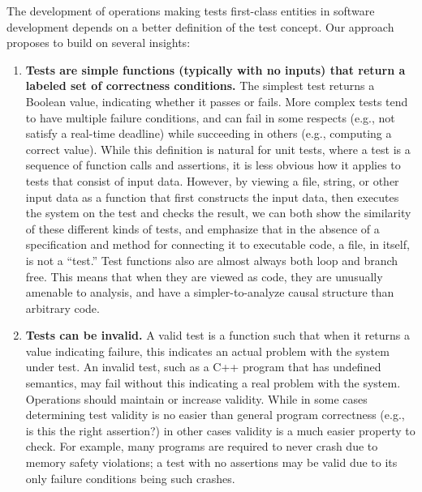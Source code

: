 The development of operations making tests first-class entities in
software development depends on a better definition of the test
concept.  Our approach proposes to build on several insights:

\begin{enumerate}
\item {\bf Tests are simple functions (typically with no inputs) that return
    a labeled set of correctness conditions.}  The simplest test
  returns a Boolean value, indicating whether it passes or fails.
  More complex tests tend to have multiple failure
  conditions, and can fail in some respects (e.g., not satisfy a
  real-time deadline) while succeeding in others (e.g.,
  computing a correct value).  While this definition is natural for
  unit tests, where a test is a sequence of
  function calls and assertions, it is less obvious how it applies to
  tests that consist of input data.  However, by viewing a file,
  string, or other input data as a function that first constructs the
  input data, then executes the system on the test and checks the
  result, we can both show the similarity of these different kinds of
  tests, and emphasize that in the absence of a specification and
  method for connecting it to executable code, a file, in itself, is
  not a ``test.''  Test functions also are almost always both loop and
  branch free.  This means that when they are viewed as code, they are
  unusually amenable to analysis, and have a simpler-to-analyze causal
  structure than arbitrary code.

\item {\bf Tests can be invalid.}  A valid test is a function such
  that when it returns a value indicating failure, this indicates an
  actual problem with the system under test.  An invalid test, such as
  a C++ program that has undefined semantics, may fail without this
  indicating a real problem with the system.  Operations should
  maintain or increase validity.  While in some cases determining test
  validity is no easier than general program correctness (e.g., is
  this the right assertion?) in other cases validity is a much easier
  property to check.  For example, many programs are required to never
  crash due to memory safety violations; a test with no assertions may
  be valid due to its only failure conditions being such crashes.


\end{enumerate}
